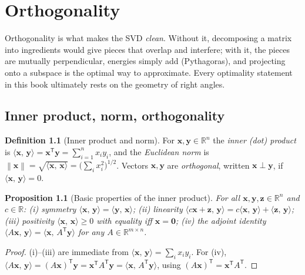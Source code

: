 \documentclass[11pt,oneside]{book}
\theoremstyle{plain}
\newtheorem{proposition}[theorem]{Proposition}
\theoremstyle{definition}
\newtheorem{definition}[theorem]{Definition}
\theoremstyle{remark}
\newcommand{\R}{\mathbb{R}}
\newcommand{\norm}[1]{\left\lVert #1 \right\rVert}
\newcommand{\T}{^{\mathsf T}}
\newcommand{\inner}[2]{\langle #1,\, #2\rangle}
\newcommand{\bx}{\mathbf{x}}
\newcommand{\by}{\mathbf{y}}
\newcommand{\bz}{\mathbf{z}}
\newcommand{\bzero}{\mathbf{0}}
\begin{document}
\chapter{Orthogonality}\label{ch:orth}

\begin{intuition_box}
Orthogonality is what makes the SVD \emph{clean}. Without it, decomposing a matrix into
ingredients would give pieces that overlap and interfere; with it, the pieces are
mutually perpendicular, energies simply add (Pythagoras), and projecting onto a subspace
is the optimal way to approximate. Every optimality statement in this book ultimately
rests on the geometry of right angles.
\end{intuition_box}

\section{Inner product, norm, orthogonality}

\begin{definition}[Inner product and norm]
For $\bx,\by\in\R^n$ the \emph{inner (dot) product} is $\inner{\bx}{\by}=\bx\T\by=
\sum_{i=1}^n x_iy_i$, and the \emph{Euclidean norm} is
$\norm{\bx}=\sqrt{\inner{\bx}{\bx}}=\bigl(\sum_i x_i^2\bigr)^{1/2}$. Vectors $\bx,\by$
are \emph{orthogonal}, written $\bx\perp\by$, if $\inner{\bx}{\by}=0$.
\end{definition}

\begin{proposition}[Basic properties of the inner product]\label{prop:innerprops}
For all $\bx,\by,\bz\in\R^n$ and $c\in\R$:
\textup{(i)} symmetry $\inner{\bx}{\by}=\inner{\by}{\bx}$;
\textup{(ii)} linearity $\inner{c\bx+\bz}{\by}=c\inner{\bx}{\by}+\inner{\bz}{\by}$;
\textup{(iii)} positivity $\inner{\bx}{\bx}\ge0$ with equality iff $\bx=\bzero$;
\textup{(iv)} the adjoint identity $\inner{A\bx}{\by}=\inner{\bx}{A\T\by}$ for any
$A\in\R^{m\times n}$.
\end{proposition}
\begin{proof}
(i)--(iii) are immediate from $\inner{\bx}{\by}=\sum_i x_iy_i$. For (iv),
$\inner{A\bx}{\by}=(A\bx)\T\by=\bx\T A\T\by=\inner{\bx}{A\T\by}$, using
$(A\bx)\T=\bx\T A\T$.
\end{proof}
\end{document}
